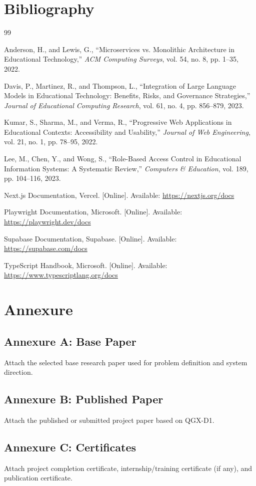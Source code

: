 \documentclass[12pt,a4paper]{article}
\begin{document}
\section*{Bibliography}
\small
\begin{thebibliography}{99}

 Anderson, H., and Lewis, G., ``Microservices vs. Monolithic Architecture in Educational Technology,'' \textit{ACM Computing Surveys}, vol. 54, no. 8, pp. 1--35, 2022.

 Davis, P., Martinez, R., and Thompson, L., ``Integration of Large Language Models in Educational Technology: Benefits, Risks, and Governance Strategies,'' \textit{Journal of Educational Computing Research}, vol. 61, no. 4, pp. 856--879, 2023.

 Kumar, S., Sharma, M., and Verma, R., ``Progressive Web Applications in Educational Contexts: Accessibility and Usability,'' \textit{Journal of Web Engineering}, vol. 21, no. 1, pp. 78--95, 2022.

 Lee, M., Chen, Y., and Wong, S., ``Role-Based Access Control in Educational Information Systems: A Systematic Review,'' \textit{Computers \& Education}, vol. 189, pp. 104--116, 2023.

 Next.js Documentation, Vercel. [Online]. Available: \url{https://nextjs.org/docs}

 Playwright Documentation, Microsoft. [Online]. Available: \url{https://playwright.dev/docs}

 Supabase Documentation, Supabase. [Online]. Available: \url{https://supabase.com/docs}

 TypeScript Handbook, Microsoft. [Online]. Available: \url{https://www.typescriptlang.org/docs}

\end{thebibliography}

\newpage
\section*{Annexure}
\subsection*{Annexure A: Base Paper}
Attach the selected base research paper used for problem definition and system direction.

\subsection*{Annexure B: Published Paper}
Attach the published or submitted project paper based on QGX-D1.

\subsection*{Annexure C: Certificates}
Attach project completion certificate, internship/training certificate (if any), and publication certificate.
\end{document}
